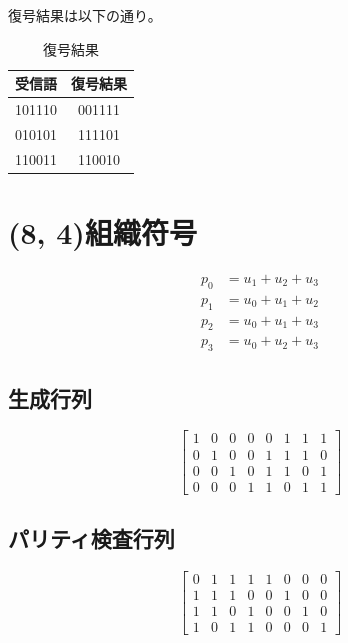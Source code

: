 \documentclass[a4paper,11pt]{jsarticle}
\begin{document}
復号結果は以下の通り。

\begin{table}[hbtp]
  \caption{復号結果}
  \label{table:decoded}
  \centering
  \begin{tabular}{|cc|}
    \hline
    受信語 & 復号結果 \\ \hline \hline
    101110 & 001111 \\ \hline
    010101 & 111101 \\ \hline
    110011 & 110010 \\ \hline
  \end{tabular}
\end{table}

\section{(8, 4)組織符号}
\begin{eqnarray*}
  p_0 &= u_1 + u_2 + u_3 \\
  p_1 &= u_0 + u_1 + u_2 \\
  p_2 &= u_0 + u_1 + u_3 \\
  p_3 &= u_0 + u_2 + u_3
\end{eqnarray*}
\subsection{生成行列}
\begin{equation*}
  \begin{bmatrix}
    1 & 0 & 0 & 0 & 0 & 1 & 1 & 1 \\
    0 & 1 & 0 & 0 & 1 & 1 & 1 & 0 \\
    0 & 0 & 1 & 0 & 1 & 1 & 0 & 1 \\
    0 & 0 & 0 & 1 & 1 & 0 & 1 & 1
  \end{bmatrix}
\end{equation*}

\subsection{パリティ検査行列}
\begin{equation*}
  \begin{bmatrix}
    0 & 1 & 1 & 1 & 1 & 0 & 0 & 0 \\
    1 & 1 & 1 & 0 & 0 & 1 & 0 & 0 \\
    1 & 1 & 0 & 1 & 0 & 0 & 1 & 0 \\
    1 & 0 & 1 & 1 & 0 & 0 & 0 & 1
  \end{bmatrix}
\end{equation*}
\end{document}
